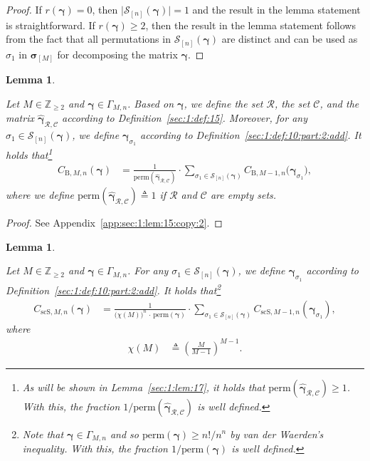 \documentclass[journal,lettersize,twocolumn]{IEEEtran} %
\newtheorem{lemma}[theorem]{Lemma}
\newcommand{\vect}[1]{ \bm{#1} }
\newcommand{\set}[1]{\mathcal{#1}}
\newcommand{\vgam}{ \vect{\gamma} }
\newcommand{\sZ}{\mathbb{Z}}
\newcommand{\defeq}{ \triangleq }
\newcommand{\perm}{ \mathrm{perm} }
\newcommand{\vsigma}{ \bm{\sigma} }
\newcommand{\setC}{\set{C}}
\newcommand{\setR}{\set{R}}
\newcommand{\setS}{\set{S}}
\newcommand{\CBM}[1]{\CBgen{M}{#1}}
\newcommand{\CBgen}[2]{C_{\mathrm{B},#1,#2}}
\newcommand{\CscSgen}[2]{C_{\mathrm{scS},#1,#2}}
\newcommand{\hvgamRCp}{ \hat{\vgam}_{\setR,\setC} }
\begin{document}
%

\begin{proof}
  If $r(\vgam) = 0$, then $\bigl| \setS_{[n]}( \vgam ) \bigr| = 1$ and
  the result in the lemma statement is straightforward. If
  $r(\vgam) \geq 2$, then the result in the lemma statement follows
  from the fact that all permutations in $ \setS_{[n]}(\vgam) $ are distinct
  and can be used as $ \sigma_1 $ in $ \vsigma_{[M]} $ for decomposing the
  matrix $ \vgam $.
\end{proof}

%

\begin{lemma}
  \label{sec:1:lem:15:copy:2}

  Let $M \in \sZ_{\geq 2}$ and $\vgam \in \Gamma_{M,n}$. Based on $\vgam$, we
  define the set $\setR$, the set $\setC$, and the matrix $\hvgamRCp$
  according to Definition~\ref{sec:1:def:15}. Moreover, for any
  $\sigma_1 \in \setS_{[n]}( \vgam )$, we define $\vgam_{\sigma_1}$ according
  to Definition~\ref{sec:1:def:10:part:2:add}. It holds that\footnote{As will
    be shown in Lemma~\ref{sec:1:lem:17}, it holds that
    $\perm(\hvgamRCp) \geq 1$. With this, the fraction $1 / \perm(\hvgamRCp)$
    is well defined.}
  \begin{align*}
    \CBM{n}(\vgam)
      &= \frac{1}{\perm(\hvgamRCp)}
         \cdot
         \sum_{\sigma_1 \in \setS_{[n]}( \vgam )}
           \CBgen{M-1}{n}
             \bigl( 
               \vgam_{\sigma_1}
             \bigr),
  \end{align*}
  where we define $\perm(\hvgamRCp) \defeq 1$ if $\setR$ and $\setC$ are
  empty sets.
\end{lemma}

%

\begin{proof}
  See Appendix~\ref{app:sec:1:lem:15:copy:2}.
\end{proof}

%

\begin{lemma}
  \label{sec:1:lem:30}
  
  Let $M \in \sZ_{\geq 2}$ and $\vgam \in \Gamma_{M,n}$. For any
  $\sigma_1 \in \setS_{[n]}( \vgam )$, we define $\vgam_{\sigma_1}$ according
  to Definition~\ref{sec:1:def:10:part:2:add}. It holds that\footnote{Note
    that $\vgam \in \Gamma_{M,n}$ and so $\perm(\vgam) \geq n! / n^n$ by van
    der Waerden's inequality. With this, the fraction $1 / \perm(\vgam)$ is
    well defined.}
  \begin{align}
    \CscSgen{M}{n}(\vgam)
      &= \frac{1}{
           \bigr( \chi(M) \bigl)^{\! n}
           \, \cdot \,
           \perm(\vgam)
         }
        \cdot \!\!\!
        \sum_{\sigma_1 \in \setS_{[n]}( \vgam )} \!\!\!
          \CscSgen{M-1}{n}( \vgam_{\sigma_1} ), \label{sec:1:eqn:176}
  \end{align}
  where
  \begin{align*}
    \chi(M)
      &\defeq
         \left( \frac{M}{M-1} \right)^{\!\! M-1}.
  \end{align*}
  
\end{lemma}
\end{document}
